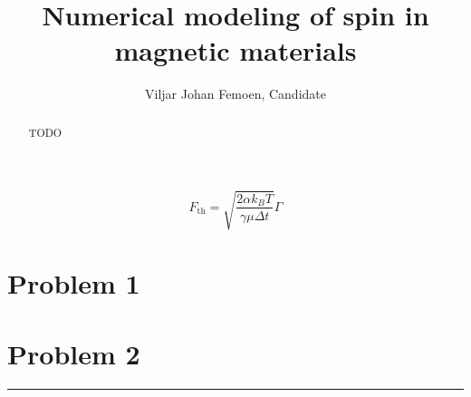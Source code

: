 \documentclass{labreport}
\title{Numerical modeling of spin in magnetic materials}
\author{Viljar Johan Femoen, Candidate \candnum}
\begin{document}
\maketitle

\begin{abstract}
TODO
\end{abstract}

\begin{equation}
    \label{eq:Fth}
    F_{\text{th}} = \sqrt{\frac{2\alpha k_BT}{\gamma\mu\Delta t}}\Gamma
\end{equation}

\section{Problem 1}
%

\section{Problem 2}








\begin{center}
    \rule{2cm}{.4pt}
\end{center}
\makeatletter
{}
\makeatother
\nocite{*}
\printbibliography
\end{document}
